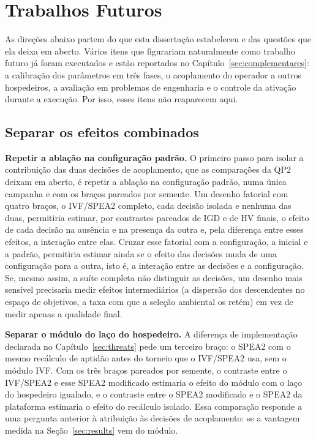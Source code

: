 \chapter{Trabalhos Futuros}
\label{sec:future_work}

As direções abaixo partem do que esta dissertação estabeleceu e das questões que ela deixa em aberto. Vários itens que figurariam naturalmente como trabalho futuro já foram executados e estão reportados no Capítulo~\ref{sec:complementares}: a calibração dos parâmetros em três fases, o acoplamento do operador a outros hospedeiros, a avaliação em problemas de engenharia e o controle da ativação durante a execução. Por isso, esses itens não reaparecem aqui.

\section{Separar os efeitos combinados}
\label{sec:fw_isolar}

\textbf{Repetir a ablação na configuração padrão.} O primeiro passo para isolar a contribuição das duas decisões de acoplamento, que as comparações da QP2 deixam em aberto, é repetir a ablação na configuração padrão, numa única campanha e com os braços pareados por semente. Um desenho fatorial com quatro braços, o IVF/SPEA2 completo, cada decisão isolada e nenhuma das duas, permitiria estimar, por contrastes pareados de IGD e de HV finais, o efeito de cada decisão na ausência e na presença da outra e, pela diferença entre esses efeitos, a interação entre elas. Cruzar esse fatorial com a configuração, a inicial e a padrão, permitiria estimar ainda se o efeito das decisões muda de uma configuração para a outra, isto é, a interação entre as decisões e a configuração. Se, mesmo assim, a suíte completa não distinguir as decisões, um desenho mais sensível precisaria medir efeitos intermediários (a dispersão dos descendentes no espaço de objetivos, a taxa com que a seleção ambiental os retém) em vez de medir apenas a qualidade final.

\textbf{Separar o módulo do laço do hospedeiro.} A diferença de implementação declarada no Capítulo~\ref{sec:threats} pede um terceiro braço: o SPEA2 com o mesmo recálculo de aptidão antes do torneio que o IVF/SPEA2 usa, sem o módulo IVF. Com os três braços pareados por semente, o contraste entre o IVF/SPEA2 e esse SPEA2 modificado estimaria o efeito do módulo com o laço do hospedeiro igualado, e o contraste entre o SPEA2 modificado e o SPEA2 da plataforma estimaria o efeito do recálculo isolado. Essa comparação responde a uma pergunta anterior à atribuição às decisões de acoplamento: se a vantagem medida na Seção~\ref{sec:results} vem do módulo.

